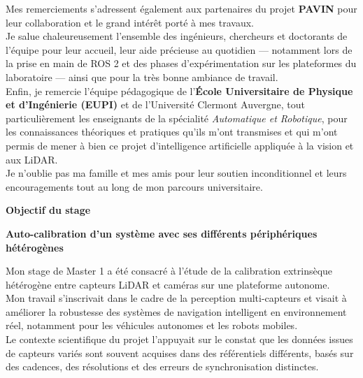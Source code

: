 \documentclass[12pt,a4paper,oneside]{report}
\begin{document}
Mes remerciements s'adressent également aux partenaires du projet \textbf{PAVIN} pour leur collaboration et le grand intérêt porté à mes travaux.\\

Je salue chaleureusement l'ensemble des ingénieurs, chercheurs et doctorants de l'équipe pour leur accueil, leur aide précieuse au quotidien — notamment lors de la prise en main de ROS 2 et des phases d'expérimentation sur les plateformes du laboratoire — ainsi que pour la très bonne ambiance de travail.\\

Enfin, je remercie l'équipe pédagogique de l'\textbf{École Universitaire de Physique et d'Ingénierie (EUPI)} et de l'Université Clermont Auvergne, tout particulièrement les enseignants de la spécialité \textit{Automatique et Robotique}, pour les connaissances théoriques et pratiques qu'ils m'ont transmises et qui m'ont permis de mener à bien ce projet d'intelligence artificielle appliquée à la vision et aux LiDAR.\\

Je n'oublie pas ma famille et mes amis pour leur soutien inconditionnel et leurs encouragements tout au long de mon parcours universitaire.\\

\newpage

\begin{center}
    {\Huge\bfseries Objectif du stage}\par
    \vspace{0.5cm}
    {\Large\bfseries Auto-calibration d'un système avec ses différents périphériques hétérogènes}
\end{center}
\thispagestyle{empty} %

\bigskip

\hspace*{1cm}Mon stage de Master 1 a été consacré à l'étude de la calibration extrinsèque hétérogène entre capteurs LiDAR et caméras sur une plateforme autonome.\\

\hspace*{1cm}Mon travail s'inscrivait dans le cadre de la perception multi-capteurs et visait à améliorer la robustesse des systèmes de navigation intelligent en environnement réel, notamment pour les véhicules autonomes et les robots mobiles. \\
\hspace*{1cm}Le contexte scientifique du projet l'appuyait sur le constat que les données issues de capteurs variés sont souvent acquises dans des référentiels différents, basés sur des cadences, des résolutions et des erreurs de synchronisation distinctes. \\
\end{document}
